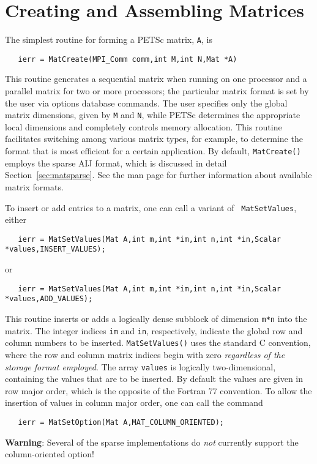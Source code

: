 \section{Creating and Assembling Matrices}
\label{sec:matcreate}

The simplest routine for forming a PETSc matrix, {\tt A}, is 
\begin{verbatim}
   ierr = MatCreate(MPI_Comm comm,int M,int N,Mat *A)
\end{verbatim}
This routine generates a sequential matrix when running on one
processor and a parallel matrix for two or more processors; the
particular matrix format is set by the user via options database
commands.  The user specifies only the global matrix dimensions, given
by {\tt M} and {\tt N}, while PETSc determines the appropriate local
dimensions and completely controls memory allocation.  This routine
facilitates switching among various matrix types, for example, to
determine the format that is most efficient for a certain
application.  By default, {\tt MatCreate()} employs the sparse AIJ
format, which is discussed in detail Section~\ref{sec:matsparse}.  See
the man page for further information about available matrix formats.

To insert or add entries to a matrix, one can call a variant of {\tt
MatSetValues}, either 
\begin{verbatim}
   ierr = MatSetValues(Mat A,int m,int *im,int n,int *in,Scalar *values,INSERT_VALUES);
\end{verbatim}
or 
\begin{verbatim}
   ierr = MatSetValues(Mat A,int m,int *im,int n,int *in,Scalar *values,ADD_VALUES);
\end{verbatim}
This routine inserts or adds a logically dense subblock of dimension
{\tt m*n} into the 
matrix. The integer indices {\tt im} and {\tt in}, respectively, indicate the 
global row and column numbers to be inserted.  {\tt MatSetValues()} uses the 
standard C convention, where the row and column matrix indices begin with 
zero {\em regardless of the storage format employed}.   The array 
{\tt values} is logically two-dimensional, containing the values that are 
to be inserted.   
By default the values are given in row major order, which is the opposite 
of the Fortran 77 convention. To allow the insertion of values in column 
major order, one can call the command 
\begin{verbatim}
   ierr = MatSetOption(Mat A,MAT_COLUMN_ORIENTED);
\end{verbatim}
{\bf Warning}: Several of the sparse implementations do {\em not} currently support
the column-oriented option!

